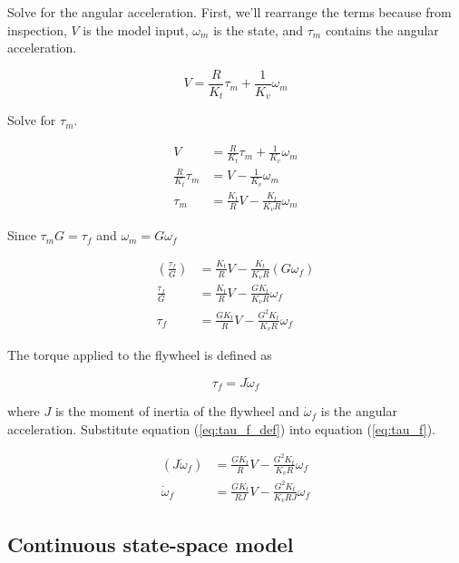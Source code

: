 Solve for the angular acceleration. First, we'll rearrange the terms because
from inspection, $V$ is the model input, $\omega_m$ is the state, and $\tau_m$
contains the angular acceleration.

\begin{equation*}
  V = \frac{R}{K_t} \tau_m + \frac{1}{K_v} \omega_m
\end{equation*}

Solve for $\tau_m$.

\begin{align*}
  V &= \frac{R}{K_t} \tau_m + \frac{1}{K_v} \omega_m \\
  \frac{R}{K_t} \tau_m &= V - \frac{1}{K_v} \omega_m \\
  \tau_m &= \frac{K_t}{R} V - \frac{K_t}{K_v R} \omega_m
\end{align*}

Since $\tau_m G = \tau_f$ and $\omega_m = G \omega_f$

\begin{align}
  \left(\frac{\tau_f}{G}\right) &= \frac{K_t}{R} V -
    \frac{K_t}{K_v R} (G \omega_f) \nonumber \\
  \frac{\tau_f}{G} &= \frac{K_t}{R} V - \frac{G K_t}{K_v R} \omega_f \nonumber
    \\
  \tau_f &= \frac{G K_t}{R} V - \frac{G^2 K_t}{K_v R} \omega_f \label{eq:tau_f}
\end{align}

The torque applied to the flywheel is defined as

\begin{equation}
  \tau_f = J \dot{\omega}_f \label{eq:tau_f_def}
\end{equation}

where $J$ is the moment of inertia of the flywheel and $\dot{\omega}_f$ is the
angular acceleration. Substitute equation (\ref{eq:tau_f_def}) into equation
(\ref{eq:tau_f}).

\begin{align}
  (J \dot{\omega}_f) &= \frac{G K_t}{R} V - \frac{G^2 K_t}{K_v R} \omega_f
    \nonumber \\
  \dot{\omega}_f &= \frac{G K_t}{RJ} V - \frac{G^2 K_t}{K_v RJ} \omega_f
    \label{eq:dot_omega_f}
\end{align}

\subsection{Continuous state-space model}

